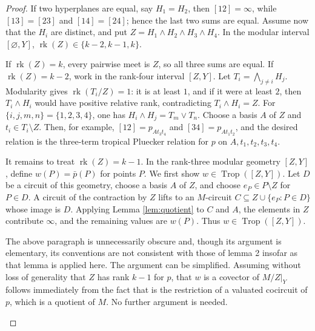 \documentclass[12pt]{article}
\theoremstyle{definition}
\newcommand{\Trop}{\operatorname{Trop}}
\newcommand{\rk}{\operatorname{rk}}
\newcommand{\review}[1]{\begin{reviewbox}#1\end{reviewbox}}
\begin{document}
\begin{proof}
If two hyperplanes are equal, say \(H_1=H_2\), then \([12]=\infty\), while \([13]=[23]\) and \([14]=[24]\); hence the last two sums are equal.  Assume now that the \(H_i\) are distinct, and put \(Z=H_1\wedge H_2\wedge H_3\wedge H_4\).  In the modular interval \([\varnothing,Y]\), \(\rk(Z)\in\{k-2,k-1,k\}\).

If \(\rk(Z)=k\), every pairwise meet is \(Z\), so all three sums are equal.  If \(\rk(Z)=k-2\), work in the rank-four interval \([Z,Y]\).  Let \(T_i=\bigwedge_{j\ne i}H_j\).  Modularity gives \(\rk(T_i/Z)=1\): it is at least \(1\), and if it were at least \(2\), then \(T_i\wedge H_i\) would have positive relative rank, contradicting \(T_i\wedge H_i=Z\).  For \(\{i,j,m,n\}=\{1,2,3,4\}\), one has \(H_i\wedge H_j=T_m\vee T_n\).  Choose a basis \(A\) of \(Z\) and \(t_i\in T_i\setminus Z\).  Then, for example, \([12]=p_{A t_3t_4}\) and \([34]=p_{A t_1t_2}\), and the desired relation is the three-term tropical Pluecker relation for \(p\) on \(A,t_1,t_2,t_3,t_4\).

It remains to treat \(\rk(Z)=k-1\).  In the rank-three modular geometry \([Z,Y]\), define \(w(P)=\bar p(P)\) for points \(P\).  We first show \(w\in\Trop([Z,Y])\).  Let \(D\) be a circuit of this geometry, choose a basis \(A\) of \(Z\), and choose \(e_P\in P\setminus Z\) for \(P\in D\).  A circuit of the contraction by \(Z\) lifts to an \(M\)-circuit \(C\subseteq Z\cup\{e_P:P\in D\}\) whose image is \(D\).  Applying Lemma \ref{lem:quotient} to \(C\) and \(A\), the elements in \(Z\) contribute \(\infty\), and the remaining values are \(w(P)\).  Thus \(w\in\Trop([Z,Y])\).
\review{The above paragraph is unnecessarily obscure and, though its argument is elementary, its conventions are not consistent with those of lemma 2 insofar as that lemma is applied here. 
The argument can be simplified. Assuming without loss of generality that $Z$ has rank $k-1$ for $p$, that $w$ is a covector of $M/Z|_Y$ follows immediately from the fact that is the restriction of a valuated cocircuit of $p$, which is a quotient of $M$. No further argument is needed.}


\end{proof}
\end{document}

